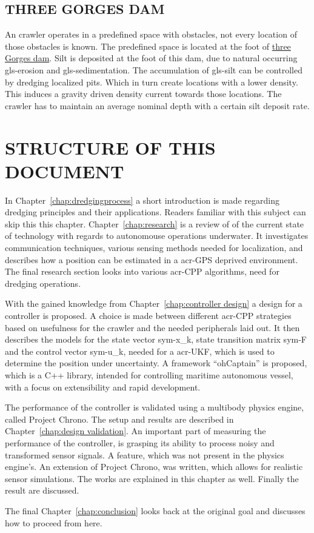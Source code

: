 \subsection{THREE GORGES DAM}\label{sec:usecase3}
An crawler operates in a predefined space with obstacles, not every location of those obstacles is known. The
predefined space is located at the foot of \href{https://www.google.nl/maps/place/Three+Gorges+Dam/@30.8263416,111
.0118356,16z/data=!4m2!3m1!1s0x368476d5e9a340d9:0xa017b4d524bd9d6c}{three Gorges dam}. Silt is deposited at the foot
of this dam, due to natural occurring \gls{gls-erosion} and \gls{gls-sedimentation}. The accumulation of
\gls{gls-silt} can be controlled by dredging localized pits. Which in turn create locations with a lower density.
This induces a gravity driven density current towards those locations. The crawler has to maintain an average nominal
depth with a certain silt deposit rate.

\section{STRUCTURE OF THIS DOCUMENT}\label{sec:structure of this document}

In Chapter~\ref{chap:dredgingprocess} a short introduction is made regarding dredging principles and their 
applications. Readers familiar with this subject can skip this this chapter. Chapter~\ref{chap:research} is a review 
of of the current state of technology with regards to autonomouse operations underwater. It investigates 
communication techniques, various sensing methods needed for localization, and describes how a position can be 
estimated in a \gls{acr-GPS} deprived environment. The final research section looks into various \gls{acr-CPP} 
algorithms, need for dredging operations.

With the gained knowledge from Chapter~\ref{chap:controller design} a design for a controller is proposed. A choice 
is made between different \gls{acr-CPP} strategies based on usefulness for the crawler and the needed peripherals 
laid out. It then describes the models for the state vector \gls{sym-x_k}, state transition matrix \gls{sym-F} and the
control vector \gls{sym-u_k}, needed for a \gls{acr-UKF}, which is used to determine the position under uncertainty. 
A framework ``ohCaptain'' is proposed, which is a C++ library, intended for controlling maritime autonomous vessel, 
with a focus on extensibility and rapid development.

The performance of the controller is validated using a multibody physics engine, called Project Chrono. The setup and
results are described in Chapter~\ref{chap:design validation}. An important part of measuring the performance of the 
controller, is grasping its ability to process noisy and transformed sensor signals. A feature, which was not present
in the physics engine's. An extension of Project Chrono, was written, which allows for realistic sensor simulations. 
The works are explained in this chapter as well. Finally the result are discussed.

\nodindent The final Chapter~\ref{chap:conclusion} looks back at the original goal and discusses how to proceed from 
here.
\glsresetall
\clearpage